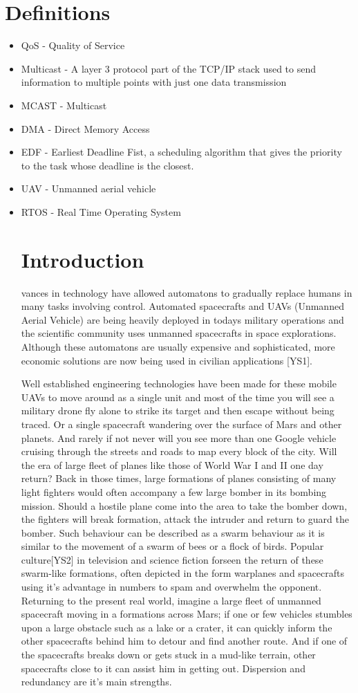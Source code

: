\documentclass[journal]{IEEEtran}
\begin{document}
\section{Definitions}
\begin{itemize}
\item QoS - Quality of Service
\item Multicast - A layer 3 protocol part of the TCP/IP stack used to send information to multiple points with just one data transmission
\item MCAST - Multicast
\item DMA - Direct Memory Access
\item EDF - Earliest Deadline Fist, a scheduling algorithm that gives the priority to the task whose deadline is the closest.
\item UAV - Unmanned aerial vehicle
\item RTOS - Real Time Operating System

\section{Introduction}
vances in technology have allowed automatons to gradually replace humans in many tasks involving control. Automated spacecrafts and UAVs (Unmanned Aerial Vehicle) are being heavily deployed in todays military operations and the scientific
community uses unmanned spacecrafts in space explorations. Although these automatons are usually expensive and sophisticated, more economic solutions are now being used in civilian applications [YS1].

Well established engineering technologies have been made for these mobile UAVs to move around as a single unit and most of the time you will see a military drone fly alone to strike its target and then escape without being traced.
Or a single spacecraft wandering over the surface of Mars and other planets. And rarely if not never will you see more than one Google vehicle cruising through the streets and roads to map every block of the city. Will the era of large fleet of planes like those of World War I and II one day return? Back in those times, large formations of planes consisting of many light fighters would often accompany a few large bomber in its bombing mission. Should a hostile plane come into the area to take the bomber down, the fighters will break formation, attack the intruder and return to guard the bomber. Such behaviour can be described as a swarm behaviour as it is similar to the movement of a swarm of bees or a flock of birds. Popular culture[YS2] in television and science fiction forseen the return of these swarm-like formations, often depicted in the form warplanes and spacecrafts using it's advantage in numbers to spam and overwhelm the opponent. Returning to the present real world, imagine a large fleet of unmanned spacecraft moving in a formations across Mars; if one or few vehicles stumbles upon a large obstacle such as a lake or a crater, it can quickly inform the other spacecrafts behind him to detour and find another route. And if one of the spacecrafts breaks down or gets stuck in a mud-like terrain, other spacecrafts close to it can assist him in getting out. Dispersion and redundancy are it's main strengths. 


\end{itemize}
\end{document}
